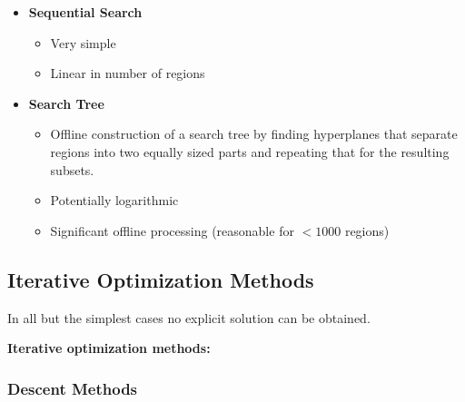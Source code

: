 \documentclass[8pt,a4paper]{scrartcl}
\begin{document}
\begin{multicols*}{3}
\begin{itemize}
\ncompaq
\item \textbf{Sequential Search}
\begin{itemize}
\item Very simple
\item Linear in number of regions
\end{itemize}
\item \textbf{Search Tree}
\begin{itemize}
\item Offline construction of a search tree by finding hyperplanes that separate regions into two equally sized parts and repeating that for the resulting subsets.
\item Potentially logarithmic
\item Significant offline processing (reasonable for $<1000$ regions)
\end{itemize}
\end{itemize}

\subsection{Iterative Optimization Methods}

In all but the simplest cases no explicit solution can be obtained.

\textbf{Iterative optimization methods:}



%
%
%
%
%
%

\subsubsection{Descent Methods}


\end{multicols*}
\end{document}

